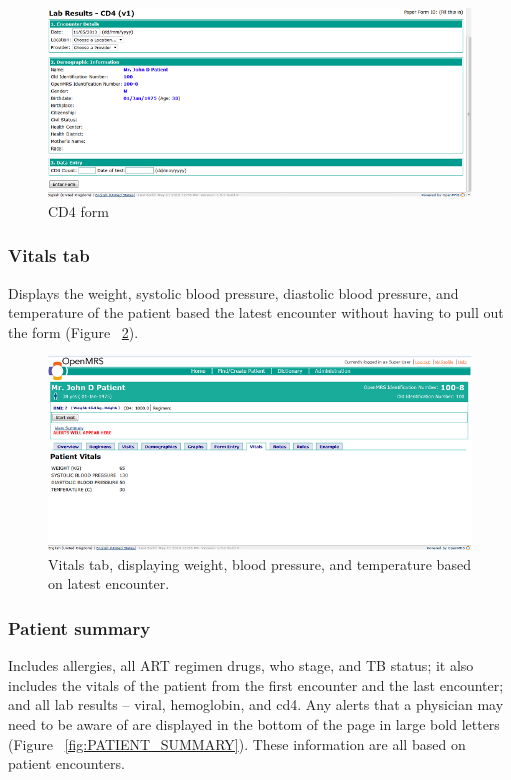 \documentclass[12pt,letterpaper]{article}
\begin{document}
\begin{figure}\begin{center}
\includegraphics[width=6.5in]{user_guide/cd4_form.png}
\end{center}
\caption{CD4 form}
\label{fig:CD4_FORM}
\end{figure}


\subsubsection{Vitals tab}
	Displays the weight, systolic blood pressure, diastolic blood pressure, and temperature of the patient based the latest encounter without having to pull out the form (Figure ~\ref{fig:VITALS_TAB}).

\begin{figure}\begin{center}
\includegraphics[width=6.5in]{user_guide/vitals_tab.png}
\end{center}
\caption{Vitals tab, displaying weight, blood pressure, and temperature 
based on latest encounter.}
\label{fig:VITALS_TAB}
\end{figure}

\subsubsection{Patient summary}
	Includes allergies, all ART regimen drugs, who stage, and TB status; it also includes the vitals of the patient from the first encounter and the last encounter; and all lab results – viral, hemoglobin, and cd4. Any alerts that a physician may need to be aware of are displayed in the bottom of the page in large bold letters (Figure ~\ref{fig:PATIENT_SUMMARY}). These information are all based on patient encounters.
\end{document}
